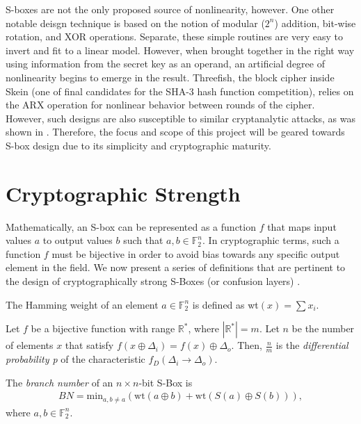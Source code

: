 \documentclass[11pt]{article}
\newcommand{\field}[1]{\mathbb{#1}} %
\begin{document}
S-boxes are not the only proposed source of nonlinearity, however. One other notable deisgn technique is based on the notion of modular ($2^n$) addition, bit-wise rotation, and XOR operations. Separate, these simple routines are very easy to invert and fit to a linear model. However, when brought together in the right way using information from the secret key as an operand, an artificial degree of nonlinearity begins to emerge in the result. Threefish, the block cipher inside Skein (one of final candidates for the SHA-3 hash function competition), relies on the ARX operation for nonlinear behavior between rounds of the cipher. However, such designs are also susceptible to similar cryptanalytic attacks, as was shown in \cite{Khovratovich:2010:RCA:1876089.1876116}. Therefore, the focus and scope of this project will be geared towards S-box design due to its simplicity and cryptographic maturity.

\section{Cryptographic Strength}
Mathematically, an S-box can be represented as a function $f$ that maps input values $a$ to output values $b$ such that $a,b \in \field{F}_2^n$. In cryptographic terms, such a function $f$ must be bijective in order to avoid bias towards any specific output element in the field. We now present a series of definitions that are pertinent to the design of cryptographically strong S-Boxes (or confusion layers) \cite{Mar_newanalysis}.


\begin{define}
The Hamming weight of an element $a \in \field{F}_2^n$ is defined as wt$(x) = \sum x_i$.
\end{define}

\begin{define}
Let $f$ be a bijective function with range $\mathbb{R^*}$, where $|\mathbb{R^*}| = m$. Let $n$ be the number of elements $x$ that satisfy $f(x \oplus \Delta_i) = f(x) \oplus \Delta_o$. Then, $\frac{n}{m}$ is the \emph{differential probability p} of the characteristic $f_D(\Delta_i \to \Delta_o)$.
\end{define}

\begin{define}
The \emph{branch number} of an $n \times n$-bit S-Box is
\begin{eqnarray*}
BN = \text{min}_{a, b\not=a}(\text{wt}(a \oplus b) + \text{wt}(S(a) \oplus S(b))),
\end{eqnarray*}
where $a, b \in \field{F}_2^n$.
\end{define}
\end{document}
